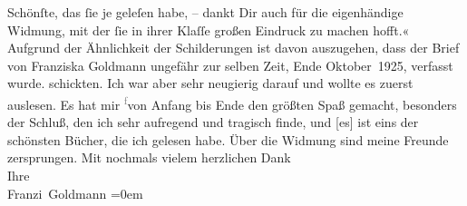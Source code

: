 \begin{ledgroupsized}[t]{13cm}
{{{                     Schönſte, das ſie je geleſen habe, – dankt Dir auch für die eigenhändige
                     Widmung, mit der ſie in ihrer Klaſſe großen Eindruck zu machen hofft.«
                  Aufgrund der Ähnlichkeit der Schilderungen ist davon auszugehen, dass der Brief
                  von Franziska Goldmann ungefähr zur selben
                  Zeit, Ende Oktober 1925, verfasst wurde.}}}\label{K_L03539-1h}
               schickten. Ich war aber sehr neugierig darauf und wollte es zuerst auslesen. Es hat
               mir \substVorne{}\textsuperscript{\textcolor{gray}{f}}\substDazwischen{}v\substHinten{}on Anfang bis Ende den größten Spaß gemacht, besonders der Schluß, den ich
               sehr aufregend und tragisch finde, und {[}es{]} ist eins der schönsten
               Bücher, die ich gelesen habe. Über die Widmung sind meine \label{T_L03539-1v}\label{T_L03539-1h} Freunde zersprungen.\pend
           \pstart
           {\pb}Mit nochmals vielem herzlichen Dank {\\[\baselineskip]}Ihre {\\[\baselineskip]}\spacefill\mbox{Franzi Goldmann}\pend
           \leftskip=0em{}
         
         \endnumbering{}\end{ledgroupsized}  \newcommand{\dateiname}{L03539}\newcommand{\titel}{Franziska Goldmann an Arthur Schnitzler, [Ende Oktober 1925?]}\newcommand{\editorInnen}{Martin Anton Müller und Laura Untner}
      